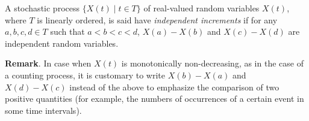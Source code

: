 \documentclass[12pt]{article}
\begin{document}
A stochastic process $\lbrace X(t)\mid t\in T\rbrace$ of real-valued
random variables $X(t)$, where $T$ is linearly ordered, is said have
\emph{independent increments} if for any $a,b,c,d\in T$ such that $a<b<c<d$, $X(a)-X(b)$ and $X(c)-X(d)$ are independent random
variables.

\textbf{Remark}.  In case when $X(t)$ is monotonically non-decreasing,
as in the case of a counting process, it is customary to write
$X(b)-X(a)$ and $X(d)-X(c)$ instead of the above to emphasize the
comparison of two positive quantities (for example, the numbers of
occurrences of a certain event in some time intervals).
\end{document}
